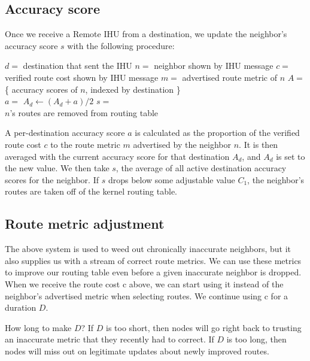 \documentclass[11pt]{article}
\newlength{\currentparskip}
\newenvironment{unbreakable}
  {\setlength{\currentparskip}{\parskip}%
	 \vspace{\currentparskip}
   \begin{minipage}{\textwidth}%
   \setlength{\parskip}{\currentparskip}%
  }
  {\end{minipage}\vspace{\currentparskip}}
\begin{document}
\subsection{Accuracy score}
\label{sec:accuracy}
\begin{unbreakable}
Once we receive a Remote IHU from a destination, we update the neighbor’s accuracy score $s$ with the following procedure:

\vspace{\abovedisplayskip}
\begin{algorithmic}
\State $d=$ destination that sent the IHU
\State $n=$ neighbor shown by IHU message
\State $c=$ verified route cost shown by IHU message
\State $m=$ advertised route metric of $n$
\State $A=$ \{ accuracy scores of $n$, indexed by destination \}\\
\State $a=$ 
\State $A_d\gets (A_d+a)/2$
\State $s=$ \\
\State $n$'s routes are removed from routing table
\EndIf
\end{algorithmic}
\vspace{\belowdisplayskip}

A per-destination accuracy score $a$ is calculated as the proportion of the verified route cost $c$ to the route metric $m$ advertised by the neighbor $n$. It is then averaged with the current accuracy score for that destination $A_d$, and $A_d$ is set to the new value. We then take $s$, the average of all active destination accuracy scores for the neighbor. If $s$ drops below some adjustable value $C_1$, the neighbor’s routes are taken off of the kernel routing table.
\end{unbreakable}

\subsection{Route metric adjustment}
\label{sec:adjustment}
The above system is used to weed out chronically inaccurate neighbors, but it also supplies us with a stream of correct route metrics. We can use these metrics to improve our routing table even before a given inaccurate neighbor is dropped. When we receive the route cost c above, we can start using it instead of the neighbor’s advertised metric when selecting routes. We continue using c for a duration $D$.
 
How long to make $D$? If $D$ is too short, then nodes will go right back to trusting an inaccurate metric that they recently had to correct. If $D$ is too long, then nodes will miss out on legitimate updates about newly improved routes.
\end{document}
